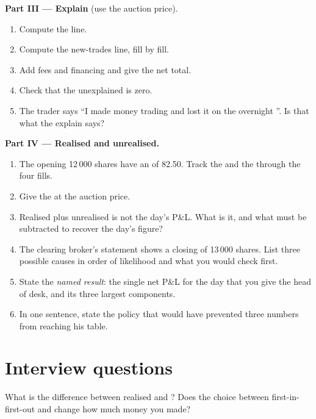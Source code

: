 \begin{problem}
\medskip\noindent\textbf{Part III --- Explain} (use the auction price).
\begin{enumerate}[resume]
\item Compute the  line.
\item Compute the new-trades line, fill by fill.
\item Add fees and financing and give the net total.
\item Check that the unexplained is zero.
\item The trader says ``I made money trading and lost it on the overnight
''. Is that what the explain says?
\end{enumerate}

\medskip\noindent\textbf{Part IV --- Realised and unrealised.}
\begin{enumerate}[resume]
\item The opening 12\,000 shares have an  of 82.50. Track the
 and the  through the four fills.
\item Give the  at the auction price.
\item Realised plus unrealised is not the day's P\&L. What is it, and what
must be subtracted to recover the day's figure?
\item The clearing broker's statement shows a closing  of 13\,000
shares. List three possible causes in order of likelihood and what you would
check first.
\item State the \emph{named result}: the single net P\&L for the day that
you give the head of desk, and its three largest components.
\item In one sentence, state the policy that would have prevented three
numbers from reaching his table.
\end{enumerate}
\end{problem}

\section{Interview questions}

\begin{interviewq}\label{iq:m1:pnl-and-positions:1}
What is the difference between realised and ? Does the choice
between first-in-first-out and  change how much money you made?
\end{interviewq}

